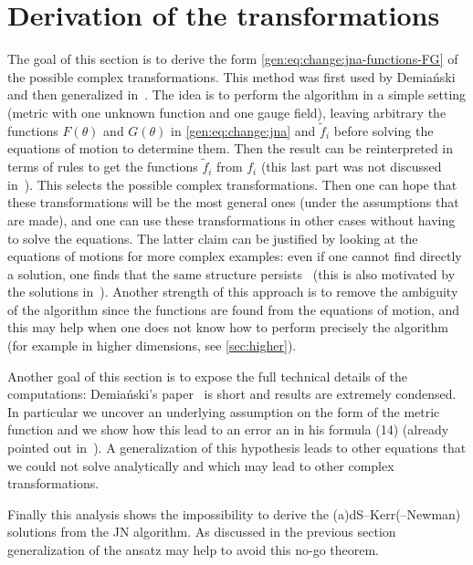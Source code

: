 \section{Derivation of the transformations}
\label{sec:derivation}


The goal of this section is to derive the form \eqref{gen:eq:change:jna-functions-FG} of the possible complex transformations.
This method was first used by Demiański~\cite{Demianski:1972:NewKerrlikeSpacetime} and then generalized in~\cite{Erbin:2016:DecipheringGeneralizingDemianskiJanisNewman}.
The idea is to perform the algorithm in a simple setting (metric with one unknown function and one gauge field), leaving arbitrary the functions $F(\theta)$ and $G(\theta)$ in \eqref{gen:eq:change:jna} and $\tilde f_i$ before solving the equations of motion to determine them.
Then the result can be reinterpreted in terms of rules to get the functions $\tilde f_i$ from $f_i$ (this last part was not discussed in~\cite{Demianski:1972:NewKerrlikeSpacetime}).
This selects the possible complex transformations.
Then one can hope that these transformations will be the most general ones (under the assumptions that are made), and one can use these transformations in other cases without having to solve the equations.
The latter claim can be justified by looking at the equations of motions for more complex examples: even if one cannot find directly a solution, one finds that the same structure persists~\cite{Erbin:2016:DecipheringGeneralizingDemianskiJanisNewman} (this is also motivated by the solutions in~\cite{Krori:1981:ChargedDemianskiMetric, Patel:1988:RadiatingDemianskitypeMetrics}).
Another strength of this approach is to remove the ambiguity of the algorithm since the functions are found from the equations of motion, and this may help when one does not know how to perform precisely the algorithm (for example in higher dimensions, see \cref{sec:higher}).


Another goal of this section is to expose the full technical details of the computations: Demiański's paper~\cite{Demianski:1972:NewKerrlikeSpacetime} is short and results are extremely condensed.
In particular we uncover an underlying assumption on the form of the metric function and we show how this lead to an error an in his formula (14) (already pointed out in~\cite{Quevedo:1992:ComplexTransformationsCurvature}).
A generalization of this hypothesis leads to other equations that we could not solve analytically and which may lead to other complex transformations.

Finally this analysis shows the impossibility to derive the (a)dS--Kerr(--Newman) solutions from the JN algorithm.
As discussed in the previous section generalization of the ansatz may help to avoid this no-go theorem.


